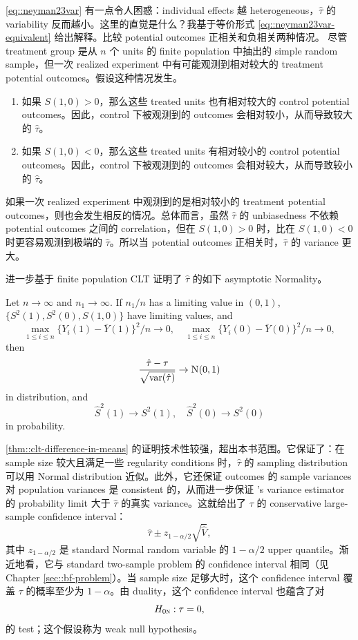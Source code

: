\eqref{eq::neyman23var} 有一点令人困惑：individual effects 越 heterogeneous，$\hat{\tau}$ 的 variability 反而越小。这里的直觉是什么？我基于等价形式 \eqref{eq::neyman23var-equivalent} 给出解释。比较 potential outcomes 正相关和负相关两种情况。
尽管 treatment group 是从 $n$ 个 units 的 finite population 中抽出的 simple random sample，但一次 realized experiment 中有可能观测到相对较大的 treatment potential outcomes。假设这种情况发生。
\begin{enumerate}
\item
如果 $S(1,0) > 0$，那么这些 treated units 也有相对较大的 control potential outcomes。因此，control 下被观测到的 outcomes 会相对较小，从而导致较大的 $\hat\tau$。
\item
如果 $S(1,0) < 0$，那么这些 treated units 有相对较小的 control potential outcomes。因此，control 下被观测到的 outcomes 会相对较大，从而导致较小的 $\hat\tau$。
\end{enumerate}
如果一次 realized experiment 中观测到的是相对较小的 treatment potential outcomes，则也会发生相反的情况。总体而言，虽然 $\hat\tau$ 的 unbiasedness 不依赖 potential outcomes 之间的 correlation，但在 $S(1,0) > 0$ 时，比在 $S(1,0) < 0$ 时更容易观测到极端的 $\hat\tau$。所以当 potential outcomes 正相关时，$\hat{\tau}$ 的 variance 更大。






\citet[][Theorem 5 and Proposition 3]{li2017general} 进一步基于 finite population CLT 证明了 $\hat{\tau}$ 的如下 asymptotic Normality。
\begin{theorem}
\label{thm::clt-difference-in-means}
Let $n\rightarrow \infty$ and $n_1 \rightarrow \infty$.
If $n_1/n$ has a limiting value in $(0,1)$,  $\{S^2(1), S^2(0), S(1,0)\}$ have limiting values, and
$$
\max_{1\leq i \leq n}\{ Y_i(1) - \bar{Y}(1) \}^2/n \rightarrow 0, \quad
\max_{1\leq i \leq n}\{ Y_i(0) - \bar{Y}(0) \}^2/n \rightarrow 0,
$$
then
$$
\frac{   \hat{\tau} - \tau }{  \sqrt{ \var(\hat{\tau}) } } \rightarrow \N01
$$
in distribution, and
$$
\hat{S}^2(1) \rightarrow S^2(1),\quad
\hat{S}^2(0) \rightarrow S^2(0)
$$
in probability.
\end{theorem}


\cref{thm::clt-difference-in-means} 的证明技术性较强，超出本书范围。它保证了：在 sample size 较大且满足一些 regularity conditions 时，$\hat{\tau} $ 的 sampling distribution 可以用 Normal distribution 近似。此外，它还保证 outcomes 的 sample variances 对 population variances 是 consistent 的，从而进一步保证 \cite{Neyman:1923}'s variance estimator 的 probability limit 大于 $\hat{\tau} $ 的真实 variance。这就给出了 $\tau$ 的 conservative large-sample confidence interval：
$$
\hat{\tau} \pm z_{1-\alpha/2} \sqrt{  \hat{V}  },
$$
其中 $z_{1-\alpha/2}$ 是 standard Normal random variable 的 $1-\alpha/2$ upper quantile。渐近地看，它与 standard two-sample problem 的 confidence interval 相同（见 Chapter \ref{sec::bf-problem}）。当 sample size 足够大时，这个 confidence interval 覆盖 $\tau$ 的概率至少为 $1-\alpha$。由 duality，这个 confidence interval 也蕴含了对
$$
H_{0\textsc{n}}: \tau = 0,
$$
的 test；这个假设称为 weak null hypothesis。



